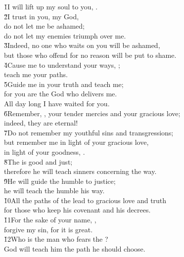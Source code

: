 \begin{poetry}
\poeml \v{1}I will lift up my soul to you, . \\
\poeml \v{2}I trust in you, my God, \\
\poemll    do not let me be ashamed; \\
\poemlll       do not let my enemies triumph over me. \\
\poeml \v{3}Indeed, no one who waits on you will be ashamed, \\
\poemll    but those who offend for no reason will be put to shame. \\
\poeml \v{4}Cause me to understand your ways, ; \\
\poemll    teach me your paths. \\
\poeml \v{5}Guide me in your truth and teach me; \\
\poemll    for you are the God who delivers me. \\
\poemlll       All day long I have waited for you. \\
\poeml \v{6}Remember, , your tender mercies and your gracious love; \\
\poemll    indeed, they are eternal! \\
\poeml \v{7}Do not remember my youthful sins and transgressions; \\
\poemll    but remember me in light of your gracious love, \\
\poemlll       in light of your goodness, . \\
\poeml \v{8}The  is good and just; \\
\poemll    therefore he will teach sinners concerning the way. \\
\poeml \v{9}He will guide the humble to justice; \\
\poemll    he will teach the humble his way. \\
\poeml \v{10}All the paths of the  lead to gracious love and truth \\
\poemll    for those who keep his covenant and his decrees. \\
\poeml \v{11}For the sake of your name, , \\
\poemll    forgive my sin, for it is great. \\
\poeml \v{12}Who is the man who fears the ? \\
\poemll    God will teach him the path he should choose. \\

\end{poetry}
